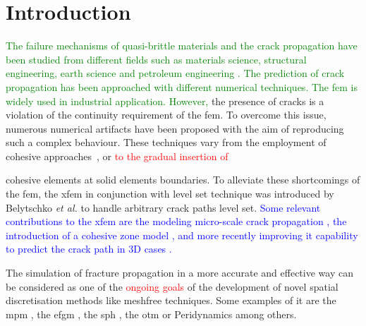 \documentclass[preprint,12pt,a4paper]{elsarticle}
\newcommand{\PNA}[1]{
  \textcolor{red}{{#1}}
}
\newcommand{\MMP}[1]{
  \textcolor{blue}{{#1}}
}
\newcommand{\DM}[1]{
  \textcolor{green}{{#1}}
}
\begin{document}
\section{Introduction}
\label{sec:1}
\DM{The failure mechanisms of quasi-brittle materials and the  crack propagation have been studied from different fields such as materials science, structural engineering, earth science and petroleum engineering . The prediction of crack propagation has been approached with different numerical techniques. The \acrfull{fem} is widely used in industrial application. However,} the presence of cracks is a violation of the continuity requirement of the \acrshort{fem}. To overcome this issue, numerous numerical
artifacts have been proposed with the aim of reproducing such a
complex behaviour. These techniques vary from the employment of cohesive
approaches~\cite{Barenblatt,Hilleborg_1976}, or \PNA{to the gradual insertion of}
cohesive elements \cite{Ortiz_1999,Pandolfi_2002,Ruiz_2000} at solid
elements boundaries. To alleviate these shortcomings of the
\acrshort{fem}, the \acrfull{xfem} in conjunction with level set
technique was introduced by Belytschko {\it et al.}
\cite{Belytschko_03} to handle arbitrary crack paths level
set. \MMP{Some relevant contributions to the \acrshort{xfem} are the
modeling micro-scale crack propagation \cite{HUANG_2018}, the
introduction of a cohesive zone model \cite{NAGASHIMA_2016}, and more
recently improving it capability to predict the crack path in 3D cases
\cite{YUN_2019}.}

The simulation of fracture propagation in a more accurate and effective
way can be considered as one of the \PNA{ongoing goals} of the development of novel spatial discretisation methods like meshfree techniques. Some
examples of it are the \acrfull{mpm}
\cite{Schreyer_2002,Chen_2002,Nairn_2003,Zhenmao_2005}, the
\acrfull{efgm} \cite{BELYTSCHKO_1995,BELYTSCHKO_2000,Zhuang_2012,Muthu_2013}, the
\acrfull{sph} \cite{Wang_2020,Wang_2019}, the \acrfull{otm} \cite{Li2010,Li_2012,Pandolfi_2013,Li_2015} or Peridynamics
\cite{HA_2011,RABCZUK_2017} among others. \\
\end{document}
